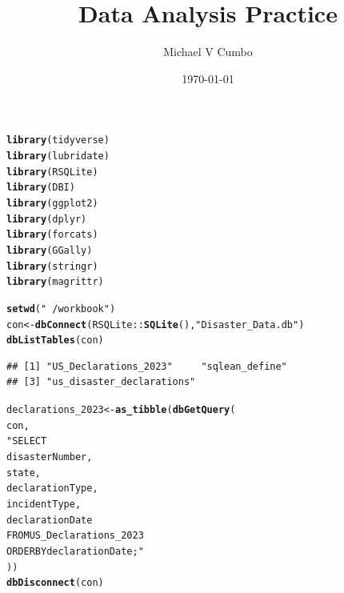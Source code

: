 \documentclass[11pt]{article}\usepackage[]{graphicx}\usepackage[]{xcolor}
\title{\textbf{Data Analysis Practice}}
\author{Michael V Cumbo}
\date{\today}
\makeatletter
\newcommand{\hlstr}[1]{\textcolor[rgb]{0.192,0.494,0.8}{#1}}%
\newcommand{\hlopt}[1]{\textcolor[rgb]{0,0,0}{#1}}%
\newcommand{\hlstd}[1]{\textcolor[rgb]{0.345,0.345,0.345}{#1}}%
\newcommand{\hlkwb}[1]{\textcolor[rgb]{0.69,0.353,0.396}{#1}}%
\newcommand{\hlkwd}[1]{\textcolor[rgb]{0.737,0.353,0.396}{\textbf{#1}}}%
\newenvironment{kframe}{%
 \def\at@end@of@kframe{}%
 \ifinner\ifhmode%
  \def\at@end@of@kframe{\end{minipage}}%
  \begin{minipage}{\columnwidth}%
 \fi\fi%
 \def\FrameCommand##1{\hskip\@totalleftmargin \hskip-\fboxsep
 \colorbox{shadecolor}{##1}\hskip-\fboxsep
     \hskip-\linewidth \hskip-\@totalleftmargin \hskip\columnwidth}%
 \MakeFramed {\advance\hsize-\width
   \@totalleftmargin\z@ \linewidth\hsize
   \@setminipage}}%
 {\par\unskip\endMakeFramed%
 \at@end@of@kframe}
\newenvironment{knitrout}{}{} %
\makeatother
\begin{document}
\maketitle
\begin{knitrout}
\color{fgcolor}\begin{kframe}
\begin{alltt}
\hlkwd{library}\hlstd{(tidyverse)}
\hlkwd{library}\hlstd{(lubridate)}
\hlkwd{library}\hlstd{(RSQLite)}
\hlkwd{library}\hlstd{(DBI)}
\hlkwd{library}\hlstd{(ggplot2)}
\hlkwd{library}\hlstd{(dplyr)}
\hlkwd{library}\hlstd{(forcats)}
\hlkwd{library}\hlstd{(GGally)}
\hlkwd{library}\hlstd{(stringr)}
\hlkwd{library}\hlstd{(magrittr)}

\hlkwd{setwd}\hlstd{(}\hlstr{"~/workbook"}\hlstd{)}
\hlstd{con} \hlkwb{<-} \hlkwd{dbConnect}\hlstd{(RSQLite}\hlopt{::}\hlkwd{SQLite}\hlstd{(),} \hlstr{"Disaster_Data.db"}\hlstd{)}
\hlkwd{dbListTables}\hlstd{(con)}
\end{alltt}
\begin{verbatim}
## [1] "US_Declarations_2023"     "sqlean_define"           
## [3] "us_disaster_declarations"
\end{verbatim}
\begin{alltt}
\hlstd{declarations_2023} \hlkwb{<-} \hlkwd{as_tibble}\hlstd{(}\hlkwd{dbGetQuery}\hlstd{(}
  \hlstd{con,}
  \hlstr{"SELECT
  disasterNumber,
  state,
  declarationType,
  incidentType,
  declarationDate
  FROM US_Declarations_2023
ORDER BY declarationDate;"}
\hlstd{))}
\hlkwd{dbDisconnect}\hlstd{(con)}
\end{alltt}
\end{kframe}
\end{knitrout}
\end{document}
